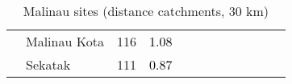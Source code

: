\begin{table}[ht]
\begin{tabular}{C{0.05\textwidth}C{0.15\textwidth}C{0.08\textwidth}C{0.08\textwidth}C{0.08\textwidth}C{0.08\textwidth}C{0.08\textwidth}C{0.08\textwidth}C{0.08\textwidth}C{0.08\textwidth}}
   & Malinau Kota & 116 & \textcolor[HTML]{000000}{1.08} & \textcolor[HTML]{FFFFFF}{0.32} & \textcolor[HTML]{FFFFFF}{3} &  &  &  &  \\ 
   & Sekatak & 111 & \textcolor[HTML]{000000}{0.87} & \textcolor[HTML]{FFFFFF}{0.33} & \textcolor[HTML]{FFFFFF}{3} &  &  &  &  \\ 
  \end{tabular}
\endgroup
\caption{Malinau sites (distance catchments, 30 km)} 
\label{tab:malinau_dist}
\end{table}
